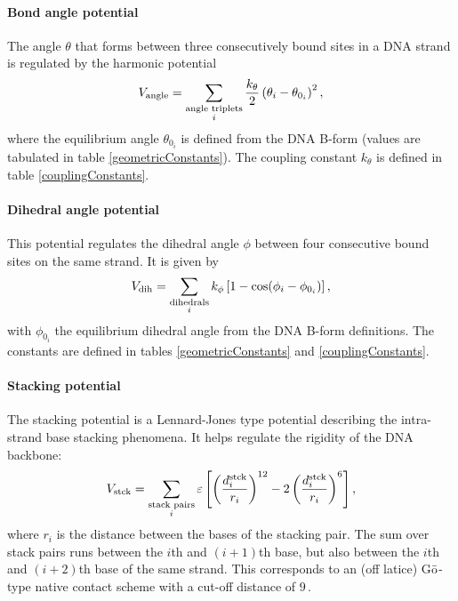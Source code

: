 \paragraph{Bond angle potential}
The angle $\theta$ that forms between three consecutively bound sites in a DNA strand is regulated by the harmonic potential
\begin{equation}
V_\text{angle}
= \sum_{\substack{\text{angle triplets}\\i}}
	\frac{k_\theta}{2} \left(
		\theta_i - \theta_{0_i}
	\right)^2,
\end{equation}
where the equilibrium angle $\theta_{0_i}$ is defined from the DNA B-form (values are tabulated in table \ref{geometricConstants}). The coupling constant $k_\theta$ is defined in table \ref{couplingConstants}.


\paragraph{Dihedral angle potential}
This potential regulates the dihedral angle $\phi$ between four consecutive bound sites on the same strand. It is given by
\begin{equation}
V_\text{dih}
= \sum_{\substack{\text{dihedrals}\\i}}
	k_\phi \left[ 1 - \cos (\phi_i - \phi_{0_i}) \right],
\end{equation}
with $\phi_{0_i}$ the equilibrium dihedral angle from the DNA B-form definitions. The constants are defined in tables \ref{geometricConstants} and \ref{couplingConstants}.


\paragraph{Stacking potential}
The stacking potential is a Lennard-Jones type potential describing the intra-strand base stacking phenomena. It helps regulate the rigidity of the DNA backbone:
\begin{equation}
V_\text{stck}
= \sum_{\substack{\text{stack pairs}\\i}}
	\varepsilon \left[
       		   \left(\frac{d^\text{stck}_i}{r_i} \right)^{12}
       		- 2\left(\frac{d^\text{stck}_i}{r_i} \right)^{6}
       	\right],
\end{equation}
where $r_i$ is the distance between the bases of the stacking pair. The sum over stack pairs runs between the $i$th and $(i+1)$th base, but also between the $i$th and $(i+2)$th base of the same strand.
This corresponds to an (off latice) G$\bar{\text o}$-type native contact scheme\cite{hoangcieplak, cieplak2003folding} with a cut-off distance of $9$\,\Angstrom.

